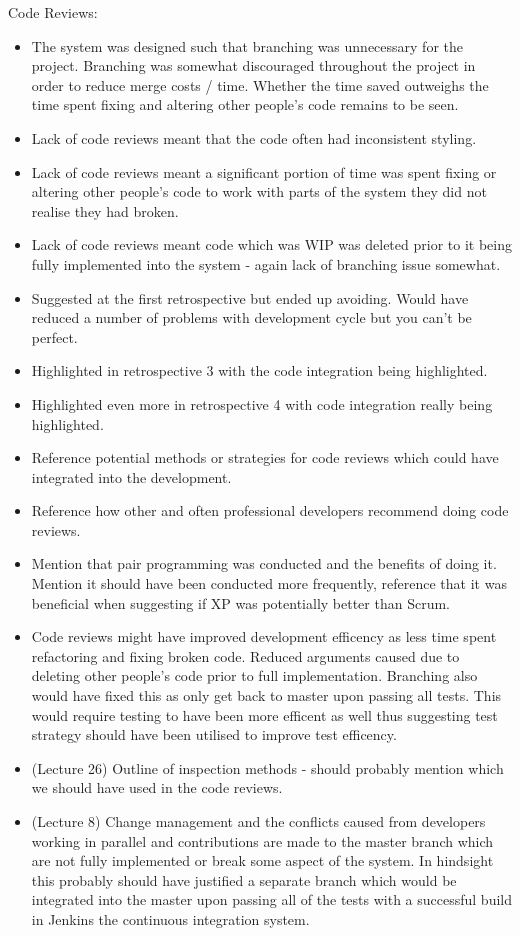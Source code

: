 \documentclass{l3proj}
\begin{document}
Code Reviews:
\begin{itemize}
\item The system was designed such that branching was unnecessary for the project. Branching was somewhat discouraged throughout the project in order to reduce merge costs / time. Whether the time saved outweighs the time spent fixing and altering other people’s code remains to be seen.
\item Lack of code reviews meant that the code often had inconsistent styling.
\item Lack of code reviews meant a significant portion of time was spent fixing or altering other people's code to work with parts of the system they did not realise they had broken.
\item Lack of code reviews meant code which was WIP was deleted prior to it being fully implemented into the system - again lack of branching issue somewhat.
\item Suggested at the first retrospective but ended up avoiding. Would have reduced a number of problems with development cycle but you can't be perfect.
\item Highlighted in retrospective 3 with the code integration being highlighted.
\item Highlighted even more in retrospective 4 with code integration really being highlighted.
\item Reference potential methods or strategies for code reviews which could have integrated into the development.
\item Reference how other and often professional developers recommend doing code reviews.
\item Mention that pair programming was conducted and the benefits of doing it. Mention it should have been conducted more frequently, reference that it was beneficial when suggesting if XP was potentially better than Scrum.
\item Code reviews might have improved development efficency as less time spent refactoring and fixing broken code. Reduced arguments caused due to deleting other people's code prior to full implementation. Branching also would have fixed this as only get back to master upon passing all tests. This would require testing to have been more efficent as well thus suggesting test strategy should have been utilised to improve test efficency.
\item (Lecture 26) Outline of inspection methods - should probably mention which we should have used in the code reviews.
\item (Lecture 8) Change management and the conflicts caused from developers working in parallel and contributions are made to the master branch which are not fully implemented or break some aspect of the system. In hindsight this probably should have justified a separate branch which would be integrated into the master upon passing all of the tests with a successful build in Jenkins the continuous integration system.
\end{itemize}
\end{document}
